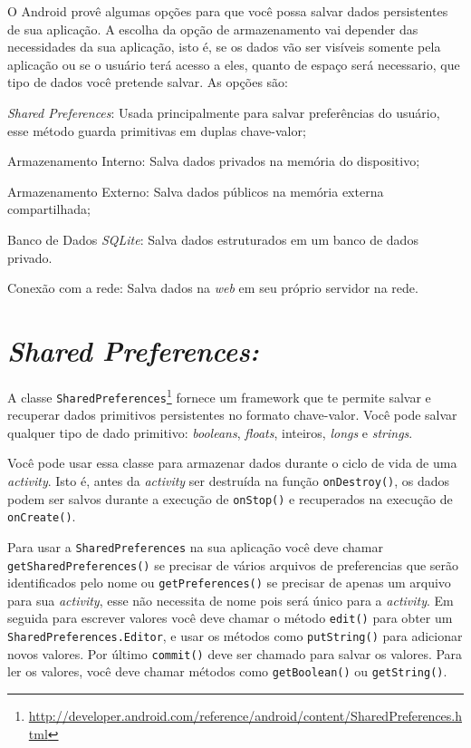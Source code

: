 \documentclass[a4paper,12pt,brazil]{book}
\begin{document}
\begin{singlespace}
	O Android provê algumas opções para que você possa salvar dados persistentes de sua aplicação. A escolha da opção de armazenamento vai depender das necessidades da sua aplicação, isto é, se os dados vão ser visíveis somente pela aplicação ou se o usuário terá acesso a eles, quanto de espaço será necessario, que tipo de dados você pretende salvar.
	As opções são: 
	\bi
		\item \emph{Shared Preferences}: Usada principalmente para salvar preferências do usuário, esse método guarda primitivas em duplas chave-valor;
		\item Armazenamento Interno: Salva dados privados na memória do dispositivo;
		\item Armazenamento Externo: Salva dados públicos na memória externa compartilhada;
		\item Banco de Dados \emph{SQLite}: Salva dados estruturados em um banco de dados privado.
		\item Conexão com a rede: Salva dados na \emph{web} em seu próprio servidor na rede.
	\ei
			
	\section{\emph{Shared Preferences:}}
		
		A classe \texttt{SharedPreferences}\footnote{\href{http://developer.android.com/reference/android/content/SharedPreferences.html}{http://developer.android.com/reference/android/content/SharedPreferences.html}} fornece um framework que te permite salvar e recuperar dados primitivos persistentes no formato chave-valor. Você pode salvar qualquer tipo de dado primitivo: \emph{booleans}, \emph{floats}, inteiros, \emph{longs} e \emph{strings}.
 
		Você pode usar essa classe para armazenar dados durante o ciclo de vida de uma \emph{activity}. Isto é, antes da \emph{activity} ser destruída na função \texttt{onDestroy()}, os dados podem ser salvos durante a execução de \texttt{onStop()} e recuperados na execução de \texttt{onCreate()}.

		Para usar a \texttt{SharedPreferences} na sua aplicação você deve chamar \texttt{getSharedPreferences()} se precisar de vários arquivos de preferencias que serão identificados pelo nome ou \texttt{getPreferences()} se precisar de apenas um arquivo para sua \emph{activity}, esse não necessita de nome pois será único para a \emph{activity}. Em seguida para escrever valores você deve chamar o método \texttt{edit()} para obter um \texttt{SharedPreferences.Editor}, e usar os métodos como \texttt{putString()} para adicionar novos valores. Por último \texttt{commit()} deve ser chamado para salvar os valores. Para ler os valores, você deve chamar métodos como \texttt{getBoolean()} ou \texttt{getString()}.


\end{singlespace}
\end{document}
